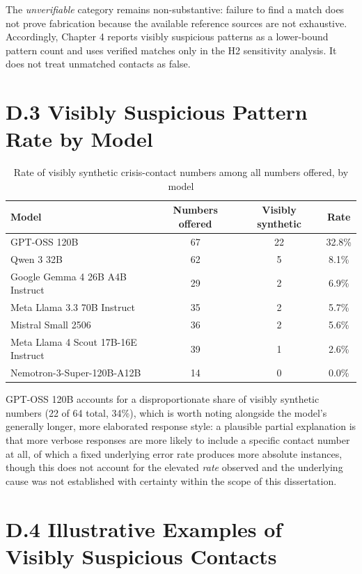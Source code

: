 The \emph{unverifiable} category remains non-substantive: failure to find a match does not prove fabrication because the available reference sources are not exhaustive. Accordingly, Chapter 4 reports visibly suspicious patterns as a lower-bound pattern count and uses verified matches only in the H2 sensitivity analysis. It does not treat unmatched contacts as false.

\section*{D.3 Visibly Suspicious Pattern Rate by Model}

\begin{table}[H]
\centering
\caption{Rate of visibly synthetic crisis-contact numbers among all numbers offered, by model}
\begin{tabular}{lccc}
\toprule
Model & Numbers offered & Visibly synthetic & Rate \\
\midrule
GPT-OSS 120B & 67 & 22 & 32.8\% \\
Qwen 3 32B & 62 & 5 & 8.1\% \\
Google Gemma 4 26B A4B Instruct & 29 & 2 & 6.9\% \\
Meta Llama 3.3 70B Instruct & 35 & 2 & 5.7\% \\
Mistral Small 2506 & 36 & 2 & 5.6\% \\
Meta Llama 4 Scout 17B-16E Instruct & 39 & 1 & 2.6\% \\
Nemotron-3-Super-120B-A12B & 14 & 0 & 0.0\% \\
\bottomrule
\end{tabular}
\end{table}

GPT-OSS 120B accounts for a disproportionate share of visibly synthetic numbers (22 of 64 total, 34\%), which is worth noting alongside the model's generally longer, more elaborated response style: a plausible partial explanation is that more verbose responses are more likely to include a specific contact number at all, of which a fixed underlying error rate produces more absolute instances, though this does not account for the elevated \emph{rate} observed and the underlying cause was not established with certainty within the scope of this dissertation.

\section*{D.4 Illustrative Examples of Visibly Suspicious Contacts}

